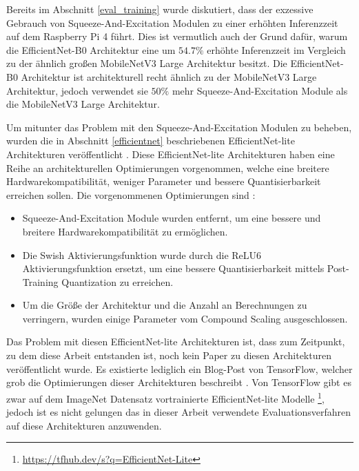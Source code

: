 Bereits im Abschnitt \ref{eval_training} wurde diskutiert, dass der exzessive Gebrauch von Squeeze-And-Excitation Modulen zu einer erhöhten Inferenzzeit auf dem Raspberry Pi 4 führt. Dies ist vermutlich auch der Grund dafür, warum die EfficientNet-B0 Architektur eine um $54.7\%$ erhöhte Inferenzzeit im Vergleich zu der ähnlich großen MobileNetV3 Large Architektur besitzt. Die EfficientNet-B0 Architektur ist architekturell recht ähnlich zu der MobileNetV3 Large Architektur, jedoch verwendet sie $50\%$ mehr Squeeze-And-Excitation Module als die MobileNetV3 Large Architektur.

Um mitunter das Problem mit den Squeeze-And-Excitation Modulen zu beheben, wurden die in Abschnitt \ref{efficientnet} beschriebenen EfficientNet-lite Architekturen veröffentlicht \cite{liu_higher_2020}. Diese EfficientNet-lite Architekturen haben eine Reihe an architekturellen Optimierungen vorgenommen, welche eine breitere Hardwarekompatibilität, weniger Parameter und bessere Quantisierbarkeit erreichen sollen. Die vorgenommenen Optimierungen sind \cite{liu_higher_2020}:
\begin{itemize}
\item Squeeze-And-Excitation Module wurden entfernt, um eine bessere und breitere Hardwarekompatibilität zu ermöglichen.
\item Die Swish Aktivierungsfunktion wurde durch die ReLU6 Aktivierungsfunktion ersetzt, um eine bessere Quantisierbarkeit mittels Post-Training Quantization zu erreichen.
\item Um die Größe der Architektur und die Anzahl an Berechnungen zu verringern, wurden einige Parameter vom Compound Scaling ausgeschlossen.
\end{itemize}
Das Problem mit diesen EfficientNet-lite Architekturen ist, dass zum Zeitpunkt, zu dem diese Arbeit entstanden ist, noch kein Paper zu diesen Architekturen veröffentlicht wurde. Es existierte lediglich ein Blog-Post von TensorFlow, welcher grob die Optimierungen dieser Architekturen beschreibt \cite{liu_higher_2020}. Von TensorFlow gibt es zwar auf dem ImageNet Datensatz vortrainierte EfficientNet-lite Modelle \footnote{\url{https://tfhub.dev/s?q=EfficientNet-Lite}}, jedoch ist es nicht gelungen das in dieser Arbeit verwendete Evaluationsverfahren auf diese Architekturen anzuwenden. 

